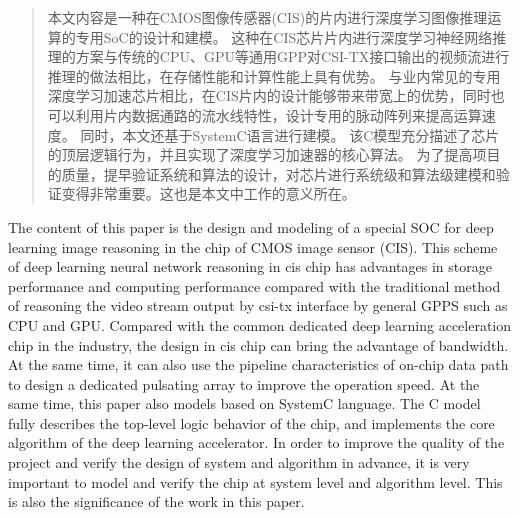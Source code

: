 
\begin{abstract}
  本文内容是一种在CMOS图像传感器(CIS)的片内进行深度学习图像推理运算的专用SoC的设计和建模。
  这种在CIS芯片片内进行深度学习神经网络推理的方案与传统的CPU、GPU等通用GPP对CSI-TX接口输出的视频流进行推理的做法相比，在存储性能和计算性能上具有优势。
  与业内常见的专用深度学习加速芯片相比，在CIS片内的设计能够带来带宽上的优势，同时也可以利用片内数据通路的流水线特性，设计专用的脉动阵列来提高运算速度。
  同时，本文还基于SystemC语言进行建模。
  该C模型充分描述了芯片的顶层逻辑行为，并且实现了深度学习加速器的核心算法。
  为了提高项目的质量，提早验证系统和算法的设计，对芯片进行系统级和算法级建模和验证变得非常重要。这也是本文中工作的意义所在。


\end{abstract}

\begin{abstract*}
The content of this paper is the design and modeling of a special SOC for deep learning image reasoning in the chip of CMOS image sensor (CIS).
This scheme of deep learning neural network reasoning in cis chip has advantages in storage performance and computing performance compared with the traditional method of reasoning the video stream output by csi-tx interface by general GPPS such as CPU and GPU.
Compared with the common dedicated deep learning acceleration chip in the industry, the design in cis chip can bring the advantage of bandwidth. At the same time, it can also use the pipeline characteristics of on-chip data path to design a dedicated pulsating array to improve the operation speed.
At the same time, this paper also models based on SystemC language.
The C model fully describes the top-level logic behavior of the chip, and implements the core algorithm of the deep learning accelerator.
In order to improve the quality of the project and verify the design of system and algorithm in advance, it is very important to model and verify the chip at system level and algorithm level. This is also the significance of the work in this paper.
\end{abstract*}
